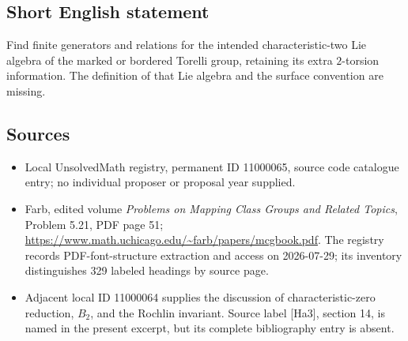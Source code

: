 \documentclass[11pt]{article}
\begin{document}
\subsection{Short English statement}
Find finite generators and relations for the intended characteristic-two Lie algebra of the marked or bordered Torelli group, retaining its extra $2$-torsion information. The definition of that Lie algebra and the surface convention are missing.
\subsection{Sources}
\begin{itemize}
\item Local UnsolvedMath registry, permanent ID 11000065, source code catalogue entry; no individual proposer or proposal year supplied.
\item Farb, edited volume \emph{Problems on Mapping Class Groups and Related Topics}, Problem 5.21, PDF page 51; \url{https://www.math.uchicago.edu/~farb/papers/mcgbook.pdf}. The registry records PDF-font-structure extraction and access on 2026-07-29; its inventory distinguishes 329 labeled headings by source page.
\item Adjacent local ID 11000064 supplies the discussion of characteristic-zero reduction, $B_2$, and the Rochlin invariant. Source label [Ha3], section 14, is named in the present excerpt, but its complete bibliography entry is absent.
\end{itemize}
\end{document}
